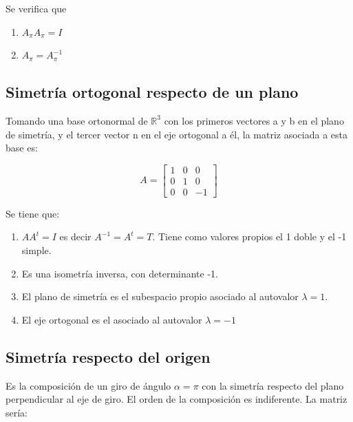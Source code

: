 \documentclass[10pt,a4paper]{article}
\theoremstyle{mystyle}
\begin{document}
Se verifica que 

\begin{enumerate}
	\item
	$ A_\pi A_\pi = I $
	\item
	$ A_\pi = A_{\pi}^{-1} $
		
\end{enumerate}

\subsection{Simetría ortogonal respecto de un plano}

Tomando una base ortonormal de $\mathbb{R}^3$ con los primeros vectores a y b en el plano de simetría, y el tercer vector n en el eje ortogonal a él, la matriz asociada a esta base es:

\[
A=
\begin{bmatrix}
1 & 0 & 0 \\
0 &  1  & 0 \\
0 & 0 & -1
\end{bmatrix}
\]

Se tiene que:

\begin{enumerate}
\item $AA^{t} = I$ es decir $A^{-1} = A^{t} = T$. Tiene como valores propios el 1 doble y el -1 simple.
\item Es una isometría inversa, con determinante -1.
\item El plano de simetría es el subespacio propio asociado al autovalor $\lambda = 1$.
\item El eje ortogonal es el asociado al autovalor $\lambda = -1$
\end{enumerate}

\subsection{Simetría respecto del origen}
Es la composición de un giro de ángulo $\alpha = \pi$ con la simetría respecto del plano perpendicular al eje de giro. El orden de la composición es indiferente.
La matriz sería:
\end{document}
